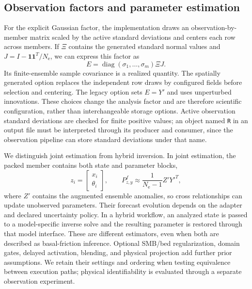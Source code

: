 \documentclass[11pt,a4paper]{article}
\newcommand{\code}[1]{\nolinkurl{#1}}
\newcommand{\Ne}{N_{\mathrm e}}
\begin{document}
\subsection{Observation factors and parameter estimation}
For the explicit Gaussian factor, the implementation draws an observation-by-member matrix scaled by the active standard deviations and centers each row across members. If \(\Xi\) contains the generated standard normal values and \(J=I-\mathbf1\mathbf1^T/\Ne\), we can express this factor as
\begin{equation}
 E=\operatorname{diag}(\sigma_1,\ldots,\sigma_m)\Xi J.
 \label{eq:obserrorfactor}
\end{equation}
Its finite-ensemble sample covariance is a realized quantity. The spatially generated option replaces the independent row draws by configured fields before selection and centering. The legacy option sets \(E=Y'\) and uses unperturbed innovations. These choices change the analysis factor and are therefore scientific configuration, rather than interchangeable storage options. Active observation standard deviations are checked for finite positive values; an object named \code{R} in an output file must be interpreted through its producer and consumer, since the observation pipeline can store standard deviations under that name.

We distinguish joint estimation from hybrid inversion. In joint estimation, the packed member contains both state and parameter blocks,
\begin{equation}
 z_i=\begin{bmatrix}x_i\\\theta_i\end{bmatrix},\qquad
 P_{z,y}^{f}\approx\frac{1}{\Ne-1}Z'Y'^T,
 \label{eq:augmented}
\end{equation}
where \(Z'\) contains the augmented ensemble anomalies, so cross relationships can update unobserved parameters. Their forecast evolution depends on the adapter and declared uncertainty policy. In a hybrid workflow, an analyzed state is passed to a model-specific inverse solve and the resulting parameter is restored through that model interface. These are different estimators, even when both are described as basal-friction inference. Optional SMB/bed regularization, domain gates, delayed activation, blending, and physical projection add further prior assumptions. We retain their settings and ordering when testing equivalence between execution paths; physical identifiability is evaluated through a separate observation experiment.
\end{document}
